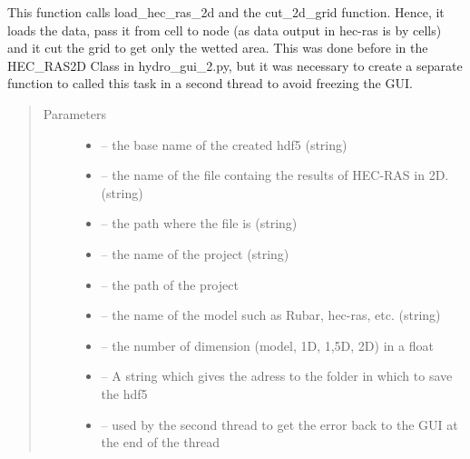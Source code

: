 \documentclass[letterpaper,10pt,english]{sphinxmanual}
\begin{document}
\begin{fulllineitems}
\label{\detokenize{index:src.hec_ras2D.load_hec_ras_2d_and_cut_grid}}
This function calls load\_hec\_ras\_2d and the cut\_2d\_grid function. Hence, it loads the data,
pass it from cell to node (as data output in hec-ras is by cells) and it cut the grid to
get only the wetted area. This was done before in the HEC\_RAS2D Class in hydro\_gui\_2.py, but it was necessary to
create a separate function to called this task in a second thread to avoid freezing the GUI.
\begin{quote}\begin{description}
\item[{Parameters}] \leavevmode\begin{itemize}
\item {} 
 -- the base name of the created hdf5 (string)

\item {} 
 -- the name of the file containg the results of HEC-RAS in 2D. (string)

\item {} 
 -- the path where the file is (string)

\item {} 
 -- the name of the project (string)

\item {} 
 -- the path of the project

\item {} 
 -- the name of the model such as Rubar, hec-ras, etc. (string)

\item {} 
 -- the number of dimension (model, 1D, 1,5D, 2D) in a float

\item {} 
 -- A string which gives the adress to the folder in which to save the hdf5

\item {} 
 -- used by the second thread to get the error back to the GUI at the end of the thread

\end{itemize}

\end{description}\end{quote}

\end{fulllineitems}
\end{document}
